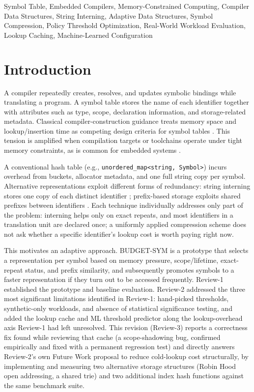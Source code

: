 \documentclass[conference]{IEEEtran}
\begin{document}
\begin{IEEEkeywords}
Symbol Table, Embedded Compilers, Memory-Constrained Computing, Compiler Data
Structures, String Interning, Adaptive Data Structures, Symbol Compression,
Policy Threshold Optimization, Real-World Workload Evaluation, Lookup
Caching, Machine-Learned Configuration
\end{IEEEkeywords}

\section{Introduction}
A compiler repeatedly creates, resolves, and updates symbolic bindings while
translating a program. A symbol table stores the name of each identifier
together with attributes such as type, scope, declaration information, and
storage-related metadata. Classical compiler-construction guidance treats
memory space and lookup/insertion time as competing design criteria for
symbol tables \cite{aho}. This tension is amplified when compilation targets
or toolchains operate under tight memory constraints, as is common for
embedded systems \cite{gcc-msp430}.

A conventional hash table (e.g., \texttt{unordered\_map<string, Symbol>})
incurs overhead from buckets, allocator metadata, and one full string copy
per symbol. Alternative representations exploit different forms of
redundancy: string interning stores one copy of each distinct identifier
\cite{rust-interning}; prefix-based storage exploits shared prefixes between
identifiers \cite{liu-lab2}. Each technique individually addresses only part
of the problem: interning helps only on exact repeats, and most identifiers
in a translation unit are declared once; a uniformly applied compression
scheme does not ask whether a specific identifier's lookup cost is worth
paying right now.

This motivates an adaptive approach. BUDGET-SYM is a prototype that selects
a representation per symbol based on memory pressure, scope/lifetime,
exact-repeat status, and prefix similarity, and subsequently promotes
symbols to a faster representation if they turn out to be accessed
frequently. Review-1 established the prototype and baseline evaluation.
Review-2 addressed the three most significant limitations identified in
Review-1: hand-picked thresholds, synthetic-only workloads, and absence of
statistical significance testing, and added the lookup cache and ML
threshold predictor along the lookup-overhead axis Review-1 had left
unresolved. This revision (Review-3) reports a correctness fix found while
reviewing that cache (a scope-shadowing bug, confirmed empirically and
fixed with a permanent regression test) and directly answers Review-2's
own Future Work proposal to reduce cold-lookup cost structurally, by
implementing and measuring two alternative storage structures (Robin Hood
open addressing, a shared trie) and two additional index hash functions
against the same benchmark suite.
\end{document}
